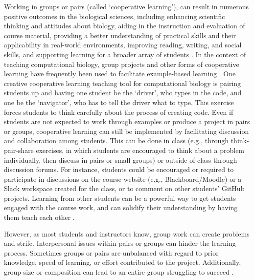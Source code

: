 Working in groups or pairs (called `cooperative learning'), can result in numerous positive outcomes in the biological sciences, including enhancing scientific thinking and attitudes about biology, aiding in the instruction and evaluation of course material, providing a better understanding of practical skills and their applicability in real-world environments, improving reading, writing, and social skills, and supporting learning for a broader array of students \citep[reviewed in][]{lord_101_2001}. 
In the context of teaching computational biology, group projects and other forms of cooperative learning have frequently been used to facilitate example-based learning  \citep[e.g.,][]{emery_application_2017,korcsmaros_teaching_2013,fuselier_trace_2011}.
One creative cooperative learning teaching tool for computational biology is pairing students up and having one student be the `driver', who types in the code, and one be the `navigator', who has to tell the driver what to type. 
This exercise forces students to think carefully about the process of creating code.
Even if students are not expected to work through examples or produce a project in pairs or groups, cooperative learning can still be implemented by facilitating discussion and collaboration among students.
This can be done in class (e.g., through think-pair-share exercises, in which students are encouraged to think about a problem individually, then discuss in pairs or small groups) or outside of class through discussion forums.
For instance, students could be encouraged or required to participate in discussions on the course website (e.g., Blackboard/Moodle) or a Slack workspace created for the class, or to comment on other students' GitHub projects.
Learning from other students can be a powerful way to get students engaged with the course work, and can solidify their understanding by having them teach each other \citep{treisman1992studying}.

However, as most students and instructors know, group work can create problems and strife.
Interpersonal issues within pairs or groups can hinder the learning process.
Sometimes groups or pairs are unbalanced with regard to prior knowledge, speed of learning, or effort contributed to the project.
Additionally, group size or composition can lead to an entire group struggling to succeed \citep[e.g.,][]{compeau_establishing_2019}. 

